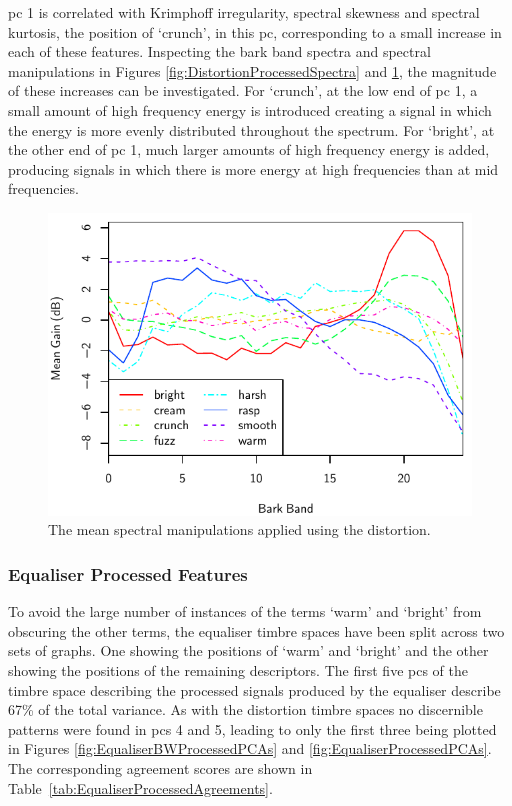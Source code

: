 			\acrshort{pc} 1 is correlated with Krimphoff irregularity, spectral skewness and spectral kurtosis,
			the position of `crunch', in this \acrshort{pc}, corresponding to a small increase in each of these
			features.  Inspecting the bark band spectra and spectral manipulations in Figures
			\ref{fig:DistortionProcessedSpectra} and \ref{fig:DistortionDifferenceSpectra}, the magnitude of
			these increases can be investigated. For `crunch', at the low end of \acrshort{pc} 1, a small
			amount of high frequency energy is introduced creating a signal in which the energy is more evenly
			distributed throughout the spectrum. For `bright', at the other end of \acrshort{pc} 1, much larger
			amounts of high frequency energy is added, producing signals in which there is more energy at high
			frequencies than at mid frequencies.

			\begin{figure}[h!]
				\centering
				\includegraphics{chapter4/Images/DistortionDifferenceSpectra.pdf}
				\caption{The mean spectral manipulations applied using the distortion.}
				\label{fig:DistortionDifferenceSpectra}
			\end{figure}

		\subsubsection*{Equaliser Processed Features}
			To avoid the large number of instances of the terms `warm' and `bright' from obscuring the other
			terms, the equaliser timbre spaces have been split across two sets of graphs. One showing the
			positions of `warm' and `bright' and the other showing the positions of the remaining descriptors.
			The first five \acrshort{pc}s of the timbre space describing the processed signals produced by the
			equaliser describe 67\% of the total variance. As with the distortion timbre spaces no discernible
			patterns were found in \acrshort{pc}s 4 and 5, leading to only the first three being plotted in
			Figures \ref{fig:EqualiserBWProcessedPCAs} and \ref{fig:EqualiserProcessedPCAs}. The corresponding
			agreement scores are shown in Table~\ref{tab:EqualiserProcessedAgreements}.

